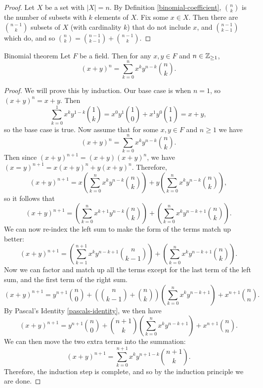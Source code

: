 \begin{proof}
    Let $X$ be a set with $|X| = n$. By Definition \ref{binomial-coefficient}, $\binom{n}{k}$ is the number of subsets with $k$ elements of $X$. Fix some $x \in X$. Then there are $\binom{n-1}{k}$ subsets of $X$ (with cardinality $k$) that do not include $x$, and $\binom{n-1}{k-1}$ which do, and so $\binom{n}{k} = \binom{n-1}{k-1} + \binom{n-1}{k}$.
\end{proof}

\begin{thm}{Binomial theorem}\label{binomial-theorem}\proofbreak
    Let $F$ be a field. Then for any $x, y \in F$ and $n \in \mathbb{Z}_{\geq 1}$, \[\left(x + y\right)^n = \sum_{k=0}^n x^ky^{n-k}\binom{n}{k}.\]
\end{thm}

\begin{proof}
    We will prove this by induction. Our base case is when $n = 1$, so $(x + y)^n = x + y$. Then \[\sum_{k=0}^{1}x^ky^{1-k}\binom{1}{k} = x^0y^1\binom{1}{0} + x^1y^0\binom{1}{1} = x + y,\] so the base case is true.
    Now assume that for some $x, y \in F$ and $n \geq 1$ we have \[\left(x + y\right)^n = \sum_{k=0}^n x^ky^{n-k}\binom{n}{k}.\] Then since $(x + y)^{n+1} = (x+y)(x+y)^n$, we have $(x = y)^{n+1} = x(x+y)^n + y(x+y)^n$.
    Therefore, \[\left(x + y\right)^{n+1} = x\left(\sum_{k=0}^n x^ky^{n-k}\binom{n}{k}\right) + y\left(\sum_{k=0}^n x^ky^{n-k}\binom{n}{k}\right),\] so it follows that \[\left(x + y\right)^{n+1} = \left(\sum_{k=0}^n x^{k+1}y^{n-k}\binom{n}{k}\right) + \left(\sum_{k=0}^n x^ky^{n-k+1}\binom{n}{k}\right).\]
    We can now re-index the left sum to make the form of the terms match up better: \[\left(x + y\right)^{n+1} = \left(\sum_{k=1}^{n+1} x^{k}y^{n-k+1}\binom{n}{k-1}\right) + \left(\sum_{k=0}^n x^ky^{n-k+1}\binom{n}{k}\right).\]
    Now we can factor and match up all the terms except for the last term of the left sum, and the first term of the right sum.
    \[\left(x + y\right)^{n+1} = y^{n+1}\binom{n}{0} + \left(\binom{n}{k-1} + \binom{n}{k}\right)\left(\sum_{k=0}^{n} x^{k}y^{n-k+1}\right) + x^{n+1}\binom{n}{n}.\]
    By Pascal's Identity \ref{pascals-identity}, we then have
    \[\left(x + y\right)^{n+1} = y^{n+1}\binom{n}{0} + \binom{n+1}{k}\left(\sum_{k=0}^{n} x^{k}y^{n-k+1}\right) + x^{n+1}\binom{n}{n}.\]
    We can then move the two extra terms into the summation:
    \[\left(x + y\right)^{n+1} = \sum_{k=0}^{n+1}x^{k}y^{n+1-k}\binom{n+1}{k}.\]
    Therefore, the induction step is complete, and so by the induction principle we are done.
\end{proof}

